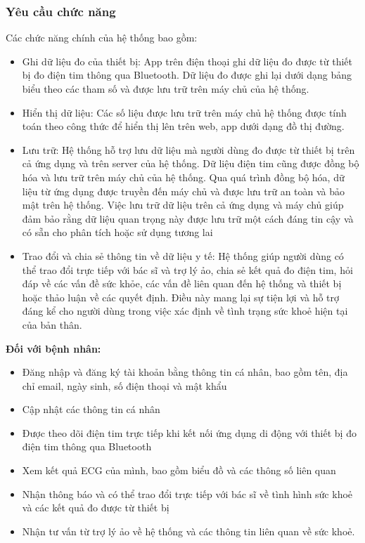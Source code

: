 \subsubsection{Yêu cầu chức năng}
Các chức năng chính của hệ thống bao gồm:
\begin{adjustwidth}{1.5em}{}
  \begin{itemize}
      \item Ghi dữ liệu đo của thiết bị: App trên điện thoại ghi dữ liệu đo được từ thiết bị đo điện tim thông qua Bluetooth. Dữ liệu đo được ghi lại dưới dạng bảng biểu theo các tham số và được lưu trữ trên máy chủ của hệ thống.
      \item Hiển thị dữ liệu: Các số liệu được lưu trữ trên máy chủ hệ thống được tính toán theo công thức để hiển thị lên trên web, app dưới dạng đồ thị đường.
      \item Lưu trữ: Hệ thống hỗ trợ lưu dữ liệu mà người dùng đo được từ thiết bị trên cả ứng dụng và trên server của hệ thống. Dữ liệu điện tim cũng được đồng bộ hóa và lưu trữ trên máy chủ của hệ thống. Qua quá trình đồng bộ hóa, dữ liệu từ ứng dụng được truyền đến máy chủ và được lưu trữ an toàn và bảo mật trên hệ thống. Việc lưu trữ dữ liệu trên cả ứng dụng và máy chủ giúp đảm bảo rằng dữ liệu quan trọng này được lưu trữ một cách đáng tin cậy và có sẵn cho phân tích hoặc sử dụng tương lai
      \item Trao đổi và chia sẻ thông tin về dữ liệu y tế: Hệ thống giúp người dùng có thể trao đổi trực tiếp với bác sĩ và trợ lý ảo, chia sẻ kết quả đo điện tim, hỏi đáp về các vấn đề sức khỏe, các vấn đề liên quan đến hệ thống và thiết bị hoặc thảo luận về các quyết định. Điều này mang lại sự tiện lợi và hỗ trợ đáng kể cho người dùng trong việc xác định về tình trạng sức khoẻ hiện tại của bản thân.
      

  \end{itemize}
\end{adjustwidth}
\textbf{Đối với bệnh nhân:}
\begin{adjustwidth}{1.5em}{}
\begin{itemize}
    \item Đăng nhập và đăng ký tài khoản bằng thông tin cá nhân, bao gồm tên, địa chỉ email, ngày sinh, số điện thoại và mật khẩu
    \item Cập nhật các thông tin cá nhân
    \item Được theo dõi điện tim trực tiếp khi kết nối ứng dụng di động với thiết bị đo điện tim thông qua Bluetooth
    \item Xem kết quả ECG của mình, bao gồm biểu đồ và các thông số liên quan
    \item Nhận thông báo và có thể trao đổi trực tiếp với bác sĩ về tình hình sức khoẻ và các kết quả đo được từ thiết bị
    \item Nhận tư vấn từ trợ lý ảo về hệ thống và các thông tin liên quan về sức khoẻ.
\end{itemize}
\end{adjustwidth}

